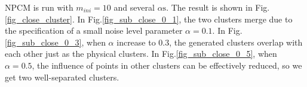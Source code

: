 \documentclass[conference]{IEEEtran}
\theoremstyle{definition}
\begin{document}
NPCM is run with $m_{ini}=10$ and several $\alpha\text{s}$. The result is shown in Fig.\ref{fig_close_cluster}. In Fig.\ref{fig_sub_close_0_1}, the two clusters merge due to the specification of a small noise level parameter $\alpha=0.1$. In Fig.\ref{fig_sub_close_0_3}, when $\alpha$ increase to $0.3$, the generated clusters overlap with each other just as the physical clusters. In Fig.\ref{fig_sub_close_0_5}, when $\alpha=0.5$, the influence of points in other clusters can be effectively reduced, so we get two well-separated clusters. 
\begin{figure}[tb]
\captionsetup[subfloat]{farskip=1pt,captionskip=1pt}%
   \centering
    \\

\end{figure}
\end{document}
